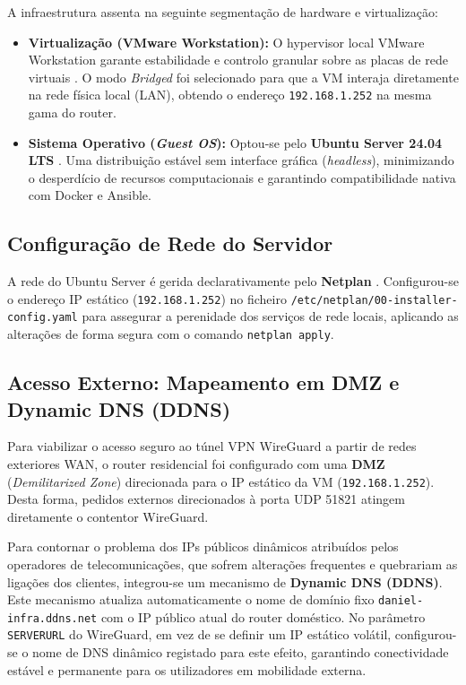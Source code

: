 A infraestrutura assenta na seguinte segmentação de hardware e virtualização:
\begin{itemize}
    \item \textbf{Virtualização (VMware Workstation):} O hypervisor local VMware Workstation garante estabilidade e controlo granular sobre as placas de rede virtuais \cite{vmware_workstation}. O modo \textit{Bridged} foi selecionado para que a VM interaja diretamente na rede física local (LAN), obtendo o endereço \texttt{192.168.1.252} na mesma gama do router.
    \item \textbf{Sistema Operativo (\textit{Guest OS}):} Optou-se pelo \textbf{Ubuntu Server 24.04 LTS} \cite{ubuntu_server}. Uma distribuição estável sem interface gráfica (\textit{headless}), minimizando o desperdício de recursos computacionais e garantindo compatibilidade nativa com Docker e Ansible.
\end{itemize}

\subsection{Configuração de Rede do Servidor}
A rede do Ubuntu Server é gerida declarativamente pelo \textbf{Netplan} \cite{netplan_docs}. Configurou-se o endereço IP estático (\texttt{192.168.1.252}) no ficheiro \texttt{/etc/netplan/00-installer-config.yaml} para assegurar a perenidade dos serviços de rede locais, aplicando as alterações de forma segura com o comando \texttt{netplan apply}.

\subsection{Acesso Externo: Mapeamento em DMZ e Dynamic DNS (DDNS)}
Para viabilizar o acesso seguro ao túnel VPN WireGuard a partir de redes exteriores WAN, o router residencial foi configurado com uma \textbf{DMZ} (\textit{Demilitarized Zone}) direcionada para o IP estático da VM (\texttt{192.168.1.252}). Desta forma, pedidos externos direcionados à porta UDP 51821 atingem diretamente o contentor WireGuard.

Para contornar o problema dos IPs públicos dinâmicos atribuídos pelos operadores de telecomunicações, que sofrem alterações frequentes e quebrariam as ligações dos clientes, integrou-se um mecanismo de \textbf{Dynamic DNS (DDNS)}. Este mecanismo atualiza automaticamente o nome de domínio fixo \texttt{daniel-infra.ddns.net} com o IP público atual do router doméstico. No parâmetro \texttt{SERVERURL} do WireGuard, em vez de se definir um IP estático volátil, configurou-se o nome de DNS dinâmico registado para este efeito, garantindo conectividade estável e permanente para os utilizadores em mobilidade externa.